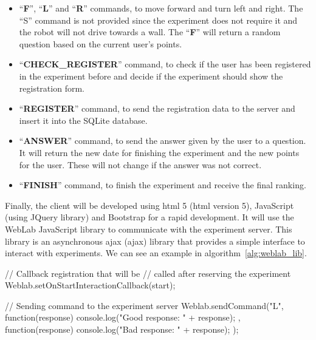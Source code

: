 \begin{itemize}
	\item ``\textbf{F}'', ``\textbf{L}'' and ``\textbf{R}'' commands, to move forward and turn left
	and right. The ``S'' command is not provided since the experiment does not require it and the
	robot will not drive towards a wall. The ``\textbf{F}'' will return a random question based on
	the current user's points.

	\item ``\textbf{CHECK\_REGISTER}'' command, to check if the user has been registered in the
	experiment before and decide if the experiment should show the registration form.

	\item ``\textbf{REGISTER}'' command, to send the registration data to the server and insert it
	into the SQLite database.

	\item ``\textbf{ANSWER}'' command, to send the answer given by the user to a question. It will
	return the new date for finishing the experiment and the new points for the user. These will not
	change if the answer was not correct.

	\item ``\textbf{FINISH}'' command, to finish the experiment and receive the final ranking.
\end{itemize}

Finally, the client will be developed using \acrshort{html} 5 (\acrlong{html} version 5), JavaScript
(using JQuery library) and Bootstrap for a rapid development. It will use the WebLab JavaScript
library to communicate with the experiment server. This library is an asynchronous \acrshort{ajax}
(\acrlong{ajax}) library that provides a simple interface to interact with experiments. We can see
an example in algorithm~\ref{alg:weblab_lib}.

\begin{center}
\begin{minipage}{.9\textwidth}
\singlespace
\begin{pyglist}[language=javascript, caption={WebLab JavaScript library example.},
	label={alg:weblab_lib}, listingname={Algorithm}, numbers=left]
// Callback registration that will be
// called after reserving the experiment
Weblab.setOnStartInteractionCallback(start);

// Sending command to the experiment server
Weblab.sendCommand("L", function(response) {
    console.log("Good response: " + response);
}, function(response) {
    console.log("Bad response: " + response);
});
\end{pyglist}
\end{minipage}
\end{center}

